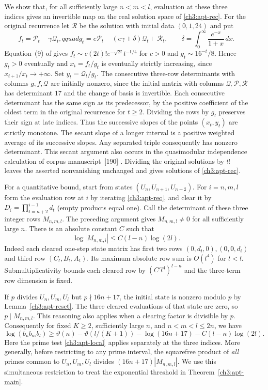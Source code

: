 \documentclass[11pt,a4paper,oneside,openany]{report}
\theoremstyle{remark}\newtheorem{remark}[theorem]{Remark}
\numberwithin{equation}{section}
\begin{document}
We show that, for all sufficiently large $n<m<l$, evaluation at
these three indices gives an invertible map on the real solution
space of \eqref{ch3:apt-rec}. For the original recurrence let
$\mathcal R$ be the solution with initial data $(0,1,24)$ and put
\[
 f_t=\mathcal P_t-\gamma\mathcal Q_t,qquad
 g_t=e\mathcal P_t-(e\gamma+\delta)\mathcal Q_t+\mathcal R_t,
 \qquad \delta=\int_0^\infty\frac{e^{-x}}{1+x}\,dx.
\]
Equation~(9) of \cite{apt-orig} gives
$f_t\sim c(2t)!e^{-\sqrt{2t}}t^{-1/4}$ for $c>0$ and
$g_t\sim16^{-t}/8$. Hence $g_t>0$ eventually and
$x_t=f_t/g_t$ is eventually strictly increasing, since
$x_{t+1}/x_t\to+\infty$. Set $y_t=\mathcal Q_t/g_t$.
The consecutive three-row determinants with columns $g,f,\mathcal Q$
are initially nonzero, since the initial matrix with columns
$\mathcal Q,\mathcal P,\mathcal R$ has determinant $17$ and the
change of basis is invertible. Each consecutive determinant has the
same sign as its predecessor, by the positive coefficient of the
oldest term in the original recurrence for $t\ge2$. Dividing the
rows by $g_t$ preserves their sign at late indices. Thus the successive
slopes of the points $(x_t,y_t)$ are strictly monotone. The secant
slope of a longer interval is a positive weighted average of its
successive slopes. Any separated triple consequently has nonzero
determinant. This secant argument also occurs in the quasimodular
independence calculation of corpus manuscript~[190] \cite{corpus}.
Dividing the original solutions by $t!$ leaves the asserted
nonvanishing unchanged and gives solutions of \eqref{ch3:apt-rec}.

For a quantitative bound, start from states $(U_n,U_{n+1},U_{n+2})$.
For $i=n,m,l$ form the evaluation row at $i$ by iterating
\eqref{ch3:apt-rec}, and clear it by
$D_i=\prod_{t=n+2}^{i-1}d_t$ (empty products equal one).
Call the determinant of these three integer rows $M_{n,m,l}$.
The preceding argument gives $M_{n,m,l}\ne0$ for all sufficiently
large $n$. There is an absolute constant $C$ such that
\[
 \log |M_{n,m,l}|\le C(l-n)\log(2l).
\]
Indeed each cleared one-step state matrix has first two rows
$(0,d_t,0),(0,0,d_t)$ and third row $(C_t,B_t,A_t)$. Its maximum
absolute row sum is $O(l^4)$ for $t<l$. Submultiplicativity bounds
each cleared row by $(C' l^4)^{l-n}$ and the three-term row dimension
is fixed.

If $p$ divides $U_n,U_m,U_l$ but $p\nmid16n+17$, the initial
state is nonzero modulo $p$ by Lemma~\ref{ch3:apt-reset}. The three
cleared evaluations of that state are zero, so $p\mid M_{n,m,l}$.
This reasoning also applies when a clearing factor is divisible by $p$.
Consequently for fixed $K\ge2$, sufficiently large $n$, and
$n<m<l\le2n$, we have
\[
 \log(b_n b_m b_l)\ge
 \vartheta(n)-\vartheta(l/(K+1))-\log(16n+17)
                  - C(l-n)\log(2l).
\]
Here the prime test \eqref{ch3:apt-local} applies separately at the three
indices. More generally, before restricting to any prime interval,
the squarefree product of \emph{all} primes common to $U_n,U_m,U_l$
divides $(16n+17)|M_{n,m,l}|$. We use this simultaneous restriction
to treat the exponential threshold in Theorem~\ref{ch3:apt-main}.
\end{document}
